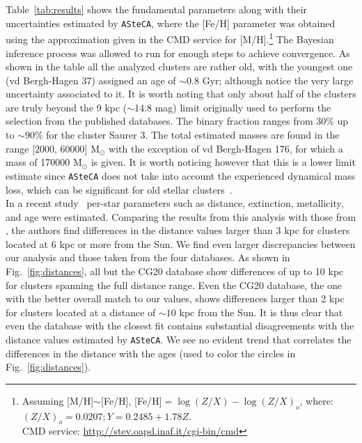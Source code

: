 \documentclass{aa}
\begin{document}
  Table~\ref{tab:results} shows the fundamental parameters along with their
  uncertainties estimated by \texttt{ASteCA}, where the [Fe/H] parameter was
  obtained using the approximation given in the CMD service for
  [M/H].\footnote{Assuming [M/H]$\sim$[Fe/H], [Fe/H]$=\log(Z/X)-\log(Z/X)_{o}$, where:
  $(Z/X)_{o}=0.0207; Y=0.2485+1.78Z$.\\
  CMD service: \url{http://stev.oapd.inaf.it/cgi-bin/cmd}}
  The Bayesian inference process was allowed to run for enough steps to achieve
  convergence.
  As shown in the table all the analyzed clusters are rather old, with the
  youngest one (vd Bergh-Hagen 37) assigned an age of $\sim0.8$ Gyr; although
  notice the very large uncertainty associated to it. It is worth noting
  that only about half of the clusters are truly beyond the 9 kpc ($\sim$14.8
  mag) limit originally used to perform the selection from the published
  databases. The binary fraction ranges from 30\% up to $\sim90$\% for the
  cluster Saurer 3. The total estimated masses are found in the range [2000,
  60000] M$_{\odot}$ with the exception of vd Bergh-Hagen 176, for which a mass
  of 170000 M$_{\odot}$ is given. It is worth noticing however that this is a
  lower limit estimate since \texttt{ASteCA} does not take into account the
  experienced dynamical mass loss, which can be significant for old stellar
  clusters~\citep{Martinez_2017}.\\

  In a recent study~\citep{Anders_2021} per-star parameters such as distance,
  extinction, metallicity, and age were estimated. Comparing the results
  from this analysis with those from \cite{Cantat_2020}, the authors find
  differences in the distance values larger than 3 kpc for clusters located at
  6 kpc or more from the Sun. We find even larger discrepancies between our
  analysis and those taken from the four databases. As shown in
  Fig.~\ref{fig:distances}, all but the CG20 database show differences of up
  to 10 kpc for clusters spanning the full distance range. Even the CG20
  database, the one with the better overall match to our values, shows
  differences larger than 2 kpc for clusters located at a distance of $\sim10$
  kpc from the Sun. It is thus clear that even the database with the closest fit
  contains substantial disagreements with the distance values estimated by 
  \texttt{ASteCA}. We see no evident trend that correlates the differences in
  the distance with the ages (used to color the circles in
  Fig.~\ref{fig:distances}).\\
\end{document}
